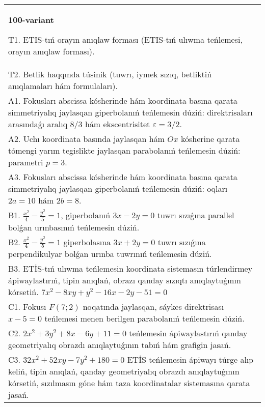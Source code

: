 \documentclass{article}
\begin{document}
\begin{tabular}{m{17cm}}
\textbf{100-variant}
\newline

T1. ETIS-tıń orayın anıqlaw forması (ETIS-tıń ulıwma teńlemesi, orayın anıqlaw forması).\\

T2. Betlik haqqında túsinik (tuwrı, iymek sızıq, betliktiń anıqlamaları hám formulaları).\\

A1. Fokusları abscissa kósherinde hám koordinata basına qarata simmetriyalıq jaylasqan giperbolanıń teńlemesin dúziń: direktrisaları arasındaǵı aralıq $8/3$ hám ekscentrisitet $\varepsilon=3/2$.\\

A2. Uchı koordinata basında jaylasqan hám $Ox$ kósherine qarata tómengi yarım tegislikte jaylasqan parabolanıń teńlemesin dúziń: parametri $p=3$.\\

A3. Fokusları abscissa kósherinde hám koordinata basına qarata simmetriyalıq jaylasqan giperbolanıń teńlemesin dúziń: oqları $2 a=10$ hám $2 b=8$.\\

B1. $\frac{x^{2}}{4} - \frac{y^{2}}{5} = 1$, giperbolanıń $3x - 2y = 0$ tuwrı sızıǵına parallel bolǵan urınbasınıń teńlemesin dúziń.  \\

B2. $\frac{x^{2}}{4} - \frac{y^{2}}{5} = 1$ giperbolasına $3x + 2y = 0$ tuwrı sızıǵına perpendikulyar bolǵan urınba tuwrınıń teńlemesin dúziń.\\

B3. ETİS-tıń ulıwma teńlemesin koordinata sistemasın túrlendirmey ápiwaylastırıń, tipin anıqlań, obrazı qanday sızıqtı anıqlaytuǵının kórsetiń. $7x^{2} - 8xy + y^{2} - 16x - 2y - 51 = 0$  \\

C1. Fokusı $F(7;2)$ noqatında jaylasqan, sáykes direktrisası $x - 5 = 0$ teńlemesi menen berilgen parabolanıń teńlemesin dúziń.  \\

C2. $2x^{2} + 3y^{2} + 8x - 6y + 11 = 0$ teńlemesin ápiwaylastırıń qanday geometriyalıq obrazdı anıqlaytuǵının tabıń hám grafigin jasań.\\

C3. $32x^{2} + 52xy - 7y^{2} + 180 = 0$ ETİS teńlemesin ápiwayı túrge alıp keliń, tipin anıqlań, qanday geometriyalıq obrazdı anıqlaytuǵının kórsetiń, sızılmasın góne hám taza koordinatalar sistemasına qarata jasań.  \\

\end{tabular}
\vspace{1cm}
\end{document}
